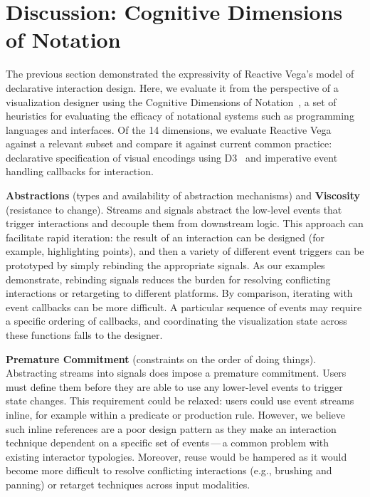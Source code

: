 \section{Discussion: Cognitive Dimensions of Notation}
\label{sec:vg:discussion}

The previous section demonstrated the expressivity of Reactive Vega's model of
declarative interaction design. Here, we evaluate it from the perspective of a
visualization designer using the Cognitive Dimensions of
Notation~\cite{blackwell:cogdim}, a set of heuristics for evaluating the
efficacy of notational systems such as programming languages and interfaces. Of
the 14 dimensions, we evaluate Reactive Vega against a relevant subset and
compare it against current common practice: declarative specification of visual
encodings using D3~\cite{bostock:d3} and imperative event handling callbacks for
interaction.

\textbf{Abstractions} (types and availability of abstraction mechanisms) and
\textbf{Viscosity} (resistance to change). Streams and signals abstract the
low-level events that trigger interactions and decouple them from downstream
logic. This approach can facilitate rapid iteration: the result of an
interaction can be designed (for example, highlighting points), and then a
variety of different event triggers can be prototyped by simply rebinding the
appropriate signals. As our examples demonstrate, rebinding signals reduces the
burden for resolving conflicting interactions or retargeting to different
platforms. By comparison, iterating with event callbacks can be more difficult.
A particular sequence of events may require a specific ordering of callbacks,
and coordinating the visualization state across these functions falls to the
designer.

\textbf{Premature Commitment} (constraints on the order of doing things).
Abstracting streams into signals does impose a premature commitment. Users must
define them before they are able to use any lower-level events to trigger state
changes. This requirement could be relaxed: users could use event streams
inline, for example within a predicate or production rule. However, we believe
such inline references are a poor design pattern as they make an interaction
technique dependent on a specific set of events\,---\,a common problem with
existing interactor typologies. Moreover, reuse would be hampered as it would
become more difficult to resolve conflicting interactions (e.g., brushing and
panning) or retarget techniques across input modalities.

